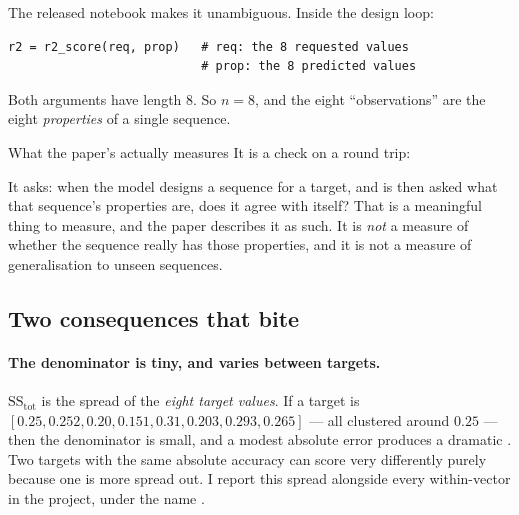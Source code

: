 The released notebook makes it unambiguous. Inside the design loop:

\begin{lstlisting}[style=py]
r2 = r2_score(req, prop)   # req: the 8 requested values
                           # prop: the 8 predicted values
\end{lstlisting}

Both arguments have length 8. So $n = 8$, and the eight ``observations'' are the
eight \emph{properties} of a single sequence.

\begin{keybox}{What the paper's \Rsq{} actually measures}
It is a  check on a round trip:

\begin{center}
\end{center}

It asks: when the model designs a sequence for a target, and is then asked what
that sequence's properties are, does it agree with itself? That is a
meaningful thing to measure, and the paper describes it as such. It is
\emph{not} a measure of whether the sequence really has those properties, and
it is not a measure of generalisation to unseen sequences.
\end{keybox}

\subsection{Two consequences that bite}

\paragraph{The denominator is tiny, and varies between targets.}
$\mathrm{SS}_{\text{tot}}$ is the spread of the \emph{eight target values}. If a
target is $[0.25, 0.252, 0.20, 0.151, 0.31, 0.203, 0.293, 0.265]$ --- all
clustered around $0.25$ --- then the denominator is small, and a modest absolute
error produces a dramatic \Rsq{}. Two targets with the same absolute accuracy
can score very differently purely because one is more spread out. I report this
spread alongside every within-vector \Rsq{} in the project, under the name
.

